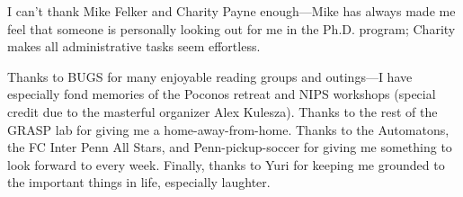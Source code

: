 I can't thank Mike Felker and Charity Payne enough---Mike has always made me 
feel that someone is personally looking out for me in the Ph.D. program;  
Charity makes all administrative tasks seem effortless.


Thanks to BUGS for many enjoyable reading groups and outings---I have 
especially fond memories of the Poconos retreat and NIPS workshops (special 
credit due to the masterful organizer Alex Kulesza). Thanks to the rest of the 
GRASP lab for giving me a home-away-from-home.  Thanks to the Automatons, the 
FC Inter Penn All Stars, and Penn-pickup-soccer for giving me something to look 
forward to every week.  Finally, thanks to Yuri for keeping me grounded to the 
important things in life, especially laughter.


